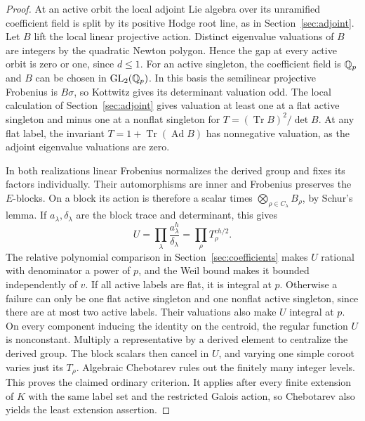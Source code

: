 \begin{proof}
At an active orbit the local adjoint Lie algebra over its unramified
coefficient field is split by its positive Hodge root line, as in
Section~\ref{sec:adjoint}. Let \(B\) lift the local linear projective
action. Distinct eigenvalue valuations of \(B\) are integers by
the quadratic Newton polygon. Hence the gap at every active orbit
is zero or one, since \(d\le1\). For an active singleton, the
coefficient field is \(\mathbb Q_p\) and \(B\) can be chosen in
\(\mathrm{GL}_2(\mathbb Q_p)\). In this basis the semilinear projective
Frobenius is \(B\sigma\), so Kottwitz gives its determinant valuation
odd. The local calculation of Section~\ref{sec:adjoint} gives
valuation at least one at a flat active singleton and minus one
at a nonflat singleton for \(T=(\operatorname{Tr}B)^2/\det B\).
At any flat label, the invariant \(T=1+\operatorname{Tr}(\operatorname{Ad} B)\)
has nonnegative valuation, as the adjoint eigenvalue valuations are zero.

In both realizations linear Frobenius normalizes the derived group and
fixes its factors individually. Their automorphisms are inner and
Frobenius preserves the \(E\)-blocks. On a block its action is
therefore a scalar times \(\bigotimes_{\rho\in C_\lambda}B_\rho\), by
Schur's lemma. If \(a_\lambda,\delta_\lambda\) are the block trace and
determinant, this gives
\[
 U=\prod_\lambda\frac{a_\lambda^h}{\delta_\lambda}
  =\prod_\rho T_\rho^{ch/2}.
\]
The relative polynomial comparison in Section~\ref{sec:coefficients}
makes \(U\) rational with denominator a power of \(p\), and the Weil
bound makes it bounded independently of \(v\). If all active labels
are flat, it is integral at \(p\). Otherwise a failure can only be
one flat active singleton and one nonflat active singleton, since
there are at most two active labels. Their valuations also make
\(U\) integral at \(p\).
On every component inducing the identity on the centroid, the regular
function \(U\) is nonconstant. Multiply a representative by a derived
element to centralize the derived group. The block scalars then cancel
in \(U\), and varying one simple coroot varies just its \(T_\rho\).
Algebraic Chebotarev rules out the finitely many integer levels. This
proves the claimed ordinary criterion. It applies after every finite
extension of \(K\) with the same label set and the restricted Galois
action, so Chebotarev also yields the least extension assertion.
\end{proof}
